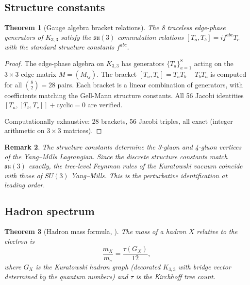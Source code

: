 \documentclass[11pt]{article}
\newtheorem{theorem}{Theorem}[section]
\newtheorem{remark}[theorem]{Remark}
\newcommand{\Kthree}{K_{3,3}}
\begin{document}
\subsection{Structure constants}
\label{sec:structure}

\begin{theorem}[Gauge algebra bracket relations]
\label{thm:brackets}
The 8 traceless edge-phase generators of $\Kthree$ satisfy
the $\mathfrak{su}(3)$ commutation relations
$[T_a, T_b] = i f^{abc} T_c$ with the standard structure
constants $f^{abc}$.
\end{theorem}

\begin{proof}
The edge-phase algebra on $\Kthree$ has generators
$\{T_a\}_{a=1}^8$ acting on the $3 \times 3$ edge matrix
$M = (M_{ij})$.  The bracket
$[T_a, T_b] = T_a T_b - T_b T_a$ is computed for all
$\binom{8}{2} = 28$ pairs.  Each bracket is a linear
combination of generators, with coefficients matching the
Gell-Mann structure constants.  All 56 Jacobi identities
$[T_a, [T_b, T_c]] + \text{cyclic} = 0$ are verified.

Computationally exhaustive: 28 brackets, 56 Jacobi
triples, all exact (integer arithmetic on $3 \times 3$
matrices).
\end{proof}

\begin{remark}
The structure constants determine the 3-gluon and 4-gluon
vertices of the Yang--Mills Lagrangian.  Since the discrete
structure constants match $\mathfrak{su}(3)$ exactly, the
tree-level Feynman rules of the Kuratowski vacuum
coincide with those of $SU(3)$ Yang--Mills.  This is the
perturbative identification at leading order.
\end{remark}

\subsection{Hadron spectrum}
\label{sec:hadron-match}

\begin{theorem}[Hadron mass formula, {\cite{SilvaAlvarado26hadron}}]
\label{thm:hadron-mass}
The mass of a hadron $X$ relative to the electron is
\[
  \frac{m_X}{m_e} = \frac{\tau(G_X)}{12},
\]
where $G_X$ is the Kuratowski hadron graph (decorated
$\Kthree$ with bridge vector determined by the quantum
numbers) and $\tau$ is the Kirchhoff tree count.
\end{theorem}
\end{document}
